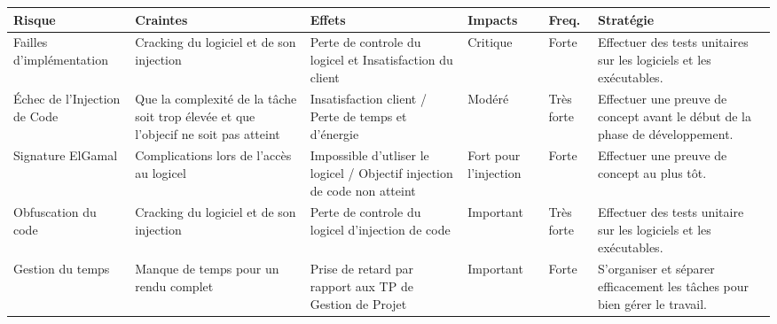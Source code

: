 \begin{table}[!h]
    \small
    \begin{tabular}{|m{2.5cm}|m{2.5cm}|m{2.5cm}|m{1.5cm}|m{1.5cm}|m{4cm}|} 
	\hline
	\textbf{Risque} & \textbf{Craintes} & \textbf{Effets} & \textbf{Impacts} & \textbf{Freq.} & \textbf{Stratégie}\\
	\hline
	Failles d'implémentation 
		& Cracking du logiciel et de son injection 
		& Perte de controle du logicel et Insatisfaction du client 
		& Critique 
		& Forte 
		& Effectuer des tests unitaires sur les logiciels et les exécutables.\\
	\hline
	Échec de l'Injection de Code 
		& Que la complexité de la tâche soit trop élevée et que l'objecif ne soit pas atteint 
		& Insatisfaction client / Perte de temps et d'énergie 
		& Modéré 
		& Très forte 
		& Effectuer une preuve de concept avant le début de la phase de développement.\\
	\hline
	Signature ElGamal 
		& Complications lors de l'accès au logicel 
		& Impossible d'utliser le logicel / Objectif injection de code non atteint 
		& Fort pour l'injection 
		& Forte 
		& Effectuer une preuve de concept au plus tôt.\\
	\hline
	Obfuscation du code 
		& Cracking du logiciel et de son injection 
		& Perte de controle du logicel d'injection de code 
		& Important 
		& Très forte 
		& Effectuer des tests unitaire sur les logiciels et les exécutables.\\
	\hline
	Gestion du temps 
		& Manque de temps pour un rendu complet 
		& Prise de retard par rapport aux TP de Gestion de Projet
		& Important 
		& Forte 
		& S’organiser et séparer efficacement les tâches pour bien gérer le travail.\\
	\hline	    
    \end{tabular}
\end{table}

